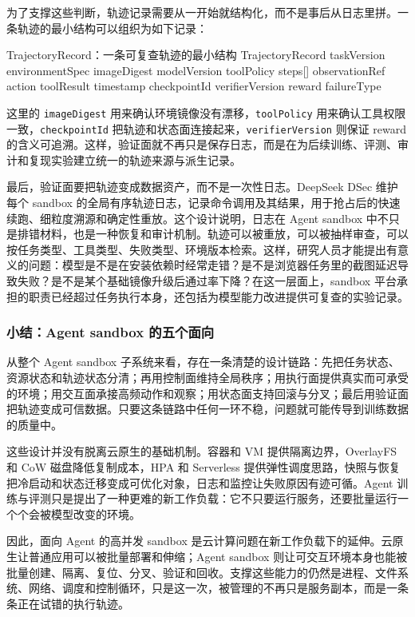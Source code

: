为了支撑这些判断，轨迹记录需要从一开始就结构化，而不是事后从日志里拼。一条轨迹的最小结构可以组织为如下记录：

\begin{pseudocodebox}{TrajectoryRecord：一条可复查轨迹的最小结构}
TrajectoryRecord {
    taskVersion
    environmentSpec
    imageDigest
    modelVersion
    toolPolicy
    steps[] {
        observationRef
        action
        toolResult
        timestamp
        checkpointId
    }
    verifierVersion
    reward
    failureType
}
\end{pseudocodebox}

这里的 \texttt{imageDigest} 用来确认环境镜像没有漂移，\texttt{toolPolicy} 用来确认工具权限一致，\texttt{checkpointId} 把轨迹和状态面连接起来，\texttt{verifierVersion} 则保证 reward 的含义可追溯。这样，验证面就不再只是保存日志，而是在为后续训练、评测、审计和复现实验建立统一的轨迹来源与派生记录。

最后，验证面要把轨迹变成数据资产，而不是一次性日志。DeepSeek DSec 维护每个 sandbox 的全局有序轨迹日志，记录命令调用及其结果，用于抢占后的快速续跑、细粒度溯源和确定性重放。这个设计说明，日志在 Agent sandbox 中不只是排错材料，也是一种恢复和审计机制。轨迹可以被重放，可以被抽样审查，可以按任务类型、工具类型、失败类型、环境版本检索。这样，研究人员才能提出有意义的问题：模型是不是在安装依赖时经常走错？是不是浏览器任务里的截图延迟导致失败？是不是某个基础镜像升级后通过率下降？在这一层面上，sandbox 平台承担的职责已经超过任务执行本身，还包括为模型能力改进提供可复查的实验记录。

\subsubsection{小结：Agent sandbox 的五个面向}

从整个 Agent sandbox 子系统来看，存在一条清楚的设计链路：先把任务状态、资源状态和轨迹状态分清；再用控制面维持全局秩序；用执行面提供真实而可承受的环境；用交互面承接高频动作和观察；用状态面支持回滚与分叉；最后用验证面把轨迹变成可信数据。只要这条链路中任何一环不稳，问题就可能传导到训练数据的质量中。

这些设计并没有脱离云原生的基础机制。容器和 VM 提供隔离边界，OverlayFS 和 CoW 磁盘降低复制成本，HPA 和 Serverless 提供弹性调度思路，快照与恢复把冷启动和状态迁移变成可优化对象，日志和监控让失败原因有迹可循。Agent 训练与评测只是提出了一种更难的新工作负载：它不只要运行服务，还要批量运行一个个会被模型改变的环境。

因此，面向 Agent 的高并发 sandbox 是云计算问题在新工作负载下的延伸。云原生让普通应用可以被批量部署和伸缩；Agent sandbox 则让可交互环境本身也能被批量创建、隔离、复位、分叉、验证和回收。支撑这些能力的仍然是进程、文件系统、网络、调度和控制循环，只是这一次，被管理的不再只是服务副本，而是一条条正在试错的执行轨迹。

